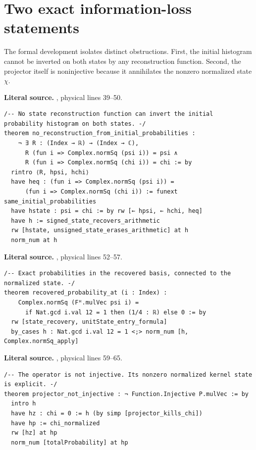 \section{Two exact information-loss statements}
The formal development isolates distinct obstructions. First, the initial
histogram cannot be inverted on both states by any reconstruction function.
Second, the projector itself is noninjective because it annihilates the nonzero
normalized state \(\chi\).

\noindent\textbf{Literal source.} \texttt{}, physical lines 39--50.

\begin{Verbatim}[breaklines=true,breakanywhere=true,fontsize=\footnotesize,samepage=true]
/-- No state reconstruction function can invert the initial probability histogram on both states. -/
theorem no_reconstruction_from_initial_probabilities :
    ¬ ∃ R : (Index → ℝ) → (Index → ℂ),
      R (fun i => Complex.normSq (psi i)) = psi ∧
      R (fun i => Complex.normSq (chi i)) = chi := by
  rintro ⟨R, hpsi, hchi⟩
  have heq : (fun i => Complex.normSq (psi i)) =
      (fun i => Complex.normSq (chi i)) := funext same_initial_probabilities
  have hstate : psi = chi := by rw [← hpsi, ← hchi, heq]
  have h := signed_state_recovers_arithmetic
  rw [hstate, unsigned_state_erases_arithmetic] at h
  norm_num at h
\end{Verbatim}

\noindent\textbf{Literal source.} \texttt{}, physical lines 52--57.

\begin{Verbatim}[breaklines=true,breakanywhere=true,fontsize=\footnotesize,samepage=true]
/-- Exact probabilities in the recovered basis, connected to the normalized state. -/
theorem recovered_probability_at (i : Index) :
    Complex.normSq (Fᴴ.mulVec psi i) =
      if Nat.gcd i.val 12 = 1 then (1/4 : ℝ) else 0 := by
  rw [state_recovery, unitState_entry_formula]
  by_cases h : Nat.gcd i.val 12 = 1 <;> norm_num [h, Complex.normSq_apply]
\end{Verbatim}

\noindent\textbf{Literal source.} \texttt{}, physical lines 59--65.

\begin{Verbatim}[breaklines=true,breakanywhere=true,fontsize=\footnotesize,samepage=true]
/-- The operator is not injective. Its nonzero normalized kernel state is explicit. -/
theorem projector_not_injective : ¬ Function.Injective P.mulVec := by
  intro h
  have hz : chi = 0 := h (by simp [projector_kills_chi])
  have hp := chi_normalized
  rw [hz] at hp
  norm_num [totalProbability] at hp
\end{Verbatim}

